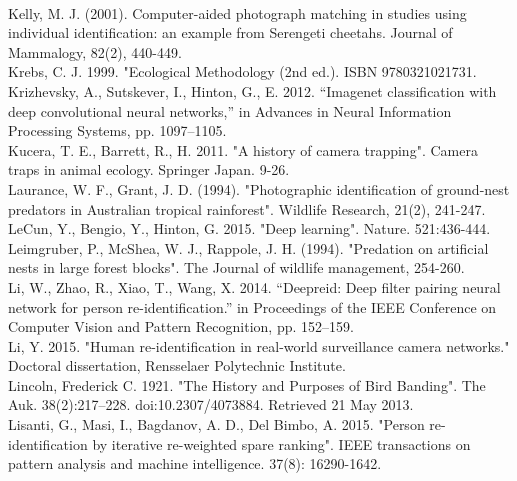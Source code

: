 \documentclass[11pt]{article}
\begin{document}
\newline
\\
Kelly, M. J. (2001). Computer-aided photograph matching in studies using individual identification: an example from Serengeti cheetahs. Journal of Mammalogy, 82(2), 440-449.
\newline
\\
Krebs, C. J. 1999. "Ecological Methodology (2nd ed.). ISBN 9780321021731.
\newline
\\
Krizhevsky, A., Sutskever, I., Hinton, G., E. 2012. “Imagenet classification with deep convolutional neural networks,” in Advances in Neural Information Processing Systems, pp. 1097–1105.
\newline
\\
Kucera, T. E., Barrett, R., H. 2011. "A history of camera trapping". Camera traps in animal ecology. Springer Japan. 9-26.
\newline
\\
Laurance, W. F., Grant, J. D. (1994). "Photographic identification of ground-nest predators in Australian tropical rainforest". Wildlife Research, 21(2), 241-247.
\newline
\\
LeCun, Y., Bengio, Y., Hinton, G. 2015. "Deep learning". Nature. 521:436-444.
\newline
\\
Leimgruber, P., McShea, W. J., Rappole, J. H. (1994). "Predation on artificial nests in large forest blocks". The Journal of wildlife management, 254-260.
\newline
\\
Li, W., Zhao, R., Xiao, T., Wang, X. 2014. “Deepreid: Deep filter pairing neural network for person re-identification.” in Proceedings of the IEEE Conference on Computer Vision and Pattern Recognition, pp. 152–159.
\newline
\\
Li, Y. 2015. "Human re-identification in real-world surveillance camera networks." Doctoral dissertation, Rensselaer Polytechnic Institute.
\newline
\\
Lincoln, Frederick C. 1921. "The History and Purposes of Bird Banding". The Auk. 38(2):217–228. doi:10.2307/4073884. Retrieved 21 May 2013.
\newline
\\
Lisanti, G., Masi, I., Bagdanov, A. D., Del Bimbo, A. 2015. "Person re-identification by iterative re-weighted spare ranking". IEEE transactions on pattern analysis and machine intelligence. 37(8): 16290-1642.
\end{document}
